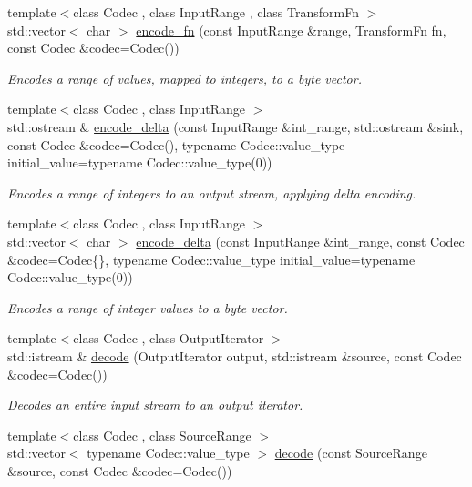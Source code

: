 \begin{DoxyCompactItemize}
{\footnotesize template$<$class Codec , class Input\+Range , class Transform\+Fn $>$ }\\std\+::vector$<$ char $>$ \mbox{\hyperlink{namespaceirk_1_1coding_adf1134471c6eb122da222bfc2c4f89d1}{encode\+\_\+fn}} (const Input\+Range \&range, Transform\+Fn fn, const Codec \&codec=Codec())
\begin{DoxyCompactList}\small\item\em Encodes a range of values, mapped to integers, to a byte vector. \end{DoxyCompactList}\item 
{\footnotesize template$<$class Codec , class Input\+Range $>$ }\\std\+::ostream \& \mbox{\hyperlink{namespaceirk_1_1coding_a83d7677e7537e69bb62c3d2b1d88a372}{encode\+\_\+delta}} (const Input\+Range \&int\+\_\+range, std\+::ostream \&sink, const Codec \&codec=Codec(), typename Codec\+::value\+\_\+type initial\+\_\+value=typename Codec\+::value\+\_\+type(0))
\begin{DoxyCompactList}\small\item\em Encodes a range of integers to an output stream, applying delta encoding. \end{DoxyCompactList}\item 
{\footnotesize template$<$class Codec , class Input\+Range $>$ }\\std\+::vector$<$ char $>$ \mbox{\hyperlink{namespaceirk_1_1coding_ae399ee16c686b77605425fc04901aa7e}{encode\+\_\+delta}} (const Input\+Range \&int\+\_\+range, const Codec \&codec=Codec\{\}, typename Codec\+::value\+\_\+type initial\+\_\+value=typename Codec\+::value\+\_\+type(0))
\begin{DoxyCompactList}\small\item\em Encodes a range of integer values to a byte vector. \end{DoxyCompactList}\item 
{\footnotesize template$<$class Codec , class Output\+Iterator $>$ }\\std\+::istream \& \mbox{\hyperlink{namespaceirk_1_1coding_aea610966545ed9edb7ad11c76a2d29f2}{decode}} (Output\+Iterator output, std\+::istream \&source, const Codec \&codec=Codec())
\begin{DoxyCompactList}\small\item\em Decodes an entire input stream to an output iterator. \end{DoxyCompactList}\item 
{\footnotesize template$<$class Codec , class Source\+Range $>$ }\\std\+::vector$<$ typename Codec\+::value\+\_\+type $>$ \mbox{\hyperlink{namespaceirk_1_1coding_abff99a70f9cc20c7e4419f67ed72dbc6}{decode}} (const Source\+Range \&source, const Codec \&codec=Codec())

\end{DoxyCompactItemize}
